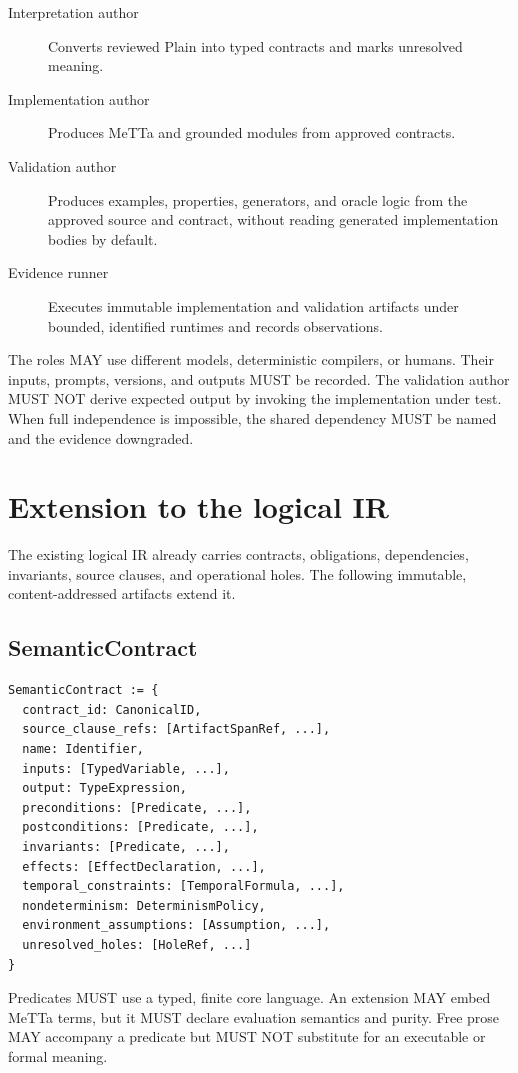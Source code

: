 \documentclass[10pt]{article}
\begin{document}
\begin{description}
\item[Interpretation author] Converts reviewed Plain into typed contracts and
marks unresolved meaning.
\item[Implementation author] Produces MeTTa and grounded modules from approved
contracts.
\item[Validation author] Produces examples, properties, generators, and oracle
logic from the approved source and contract, without reading generated
implementation bodies by default.
\item[Evidence runner] Executes immutable implementation and validation
artifacts under bounded, identified runtimes and records observations.
\end{description}

The roles MAY use different models, deterministic compilers, or humans.  Their
inputs, prompts, versions, and outputs MUST be recorded.  The validation author
MUST NOT derive expected output by invoking the implementation under test.
When full independence is impossible, the shared dependency MUST be named and
the evidence downgraded.

\section{Extension to the logical IR}

The existing logical IR already carries contracts, obligations, dependencies,
invariants, source clauses, and operational holes.  The following immutable,
content-addressed artifacts extend it.

\subsection{SemanticContract}

\begin{lstlisting}
SemanticContract := {
  contract_id: CanonicalID,
  source_clause_refs: [ArtifactSpanRef, ...],
  name: Identifier,
  inputs: [TypedVariable, ...],
  output: TypeExpression,
  preconditions: [Predicate, ...],
  postconditions: [Predicate, ...],
  invariants: [Predicate, ...],
  effects: [EffectDeclaration, ...],
  temporal_constraints: [TemporalFormula, ...],
  nondeterminism: DeterminismPolicy,
  environment_assumptions: [Assumption, ...],
  unresolved_holes: [HoleRef, ...]
}
\end{lstlisting}

Predicates MUST use a typed, finite core language.  An extension MAY embed
MeTTa terms, but it MUST declare evaluation semantics and purity.  Free prose
MAY accompany a predicate but MUST NOT substitute for an executable or formal
meaning.
\end{document}
